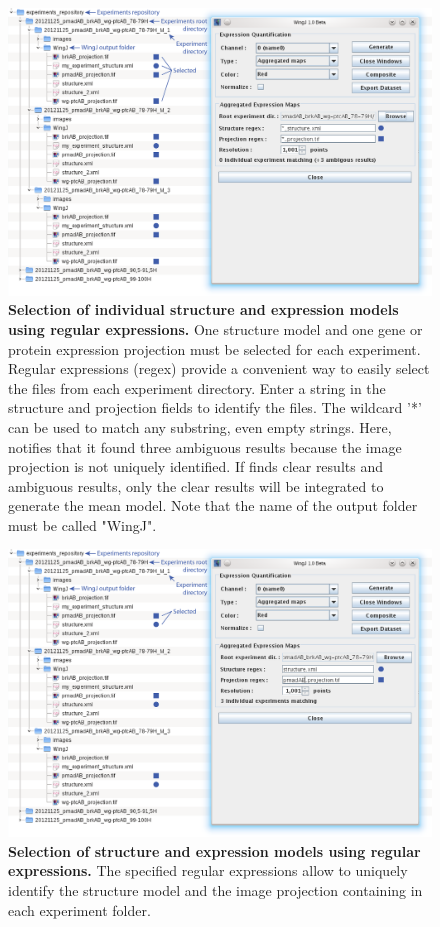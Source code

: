 \begin{figure}[!h]
\centering
\includegraphics[scale=1.2]{images/regex1_cropped_1440.png}
\caption{\textbf{Selection of individual structure and expression models using regular expressions.} One structure model and one gene or protein expression projection must be selected for each experiment. Regular expressions (regex) provide a convenient way to easily select the files from each experiment directory. Enter a string in the structure and projection fields to identify the files. The wildcard '*' can be used to match any substring, even empty strings. Here, \wingj notifies that it found three ambiguous results because the image projection is not uniquely identified. If \wingj finds clear results and ambiguous results, only the clear results will be integrated to generate the mean model. Note that the name of the \wingj output folder must be called "WingJ".}
\label{fig:wingj_regex1}
\end{figure}

\begin{figure}[!h]
\centering
\includegraphics[scale=1.2]{images/regex2_cropped_1440.png}
\caption{\textbf{Selection of structure and expression models using regular expressions.} The specified regular expressions allow to uniquely identify the structure model and the image projection containing in each experiment folder.}
\label{fig:wingj_regex2}
\end{figure}

